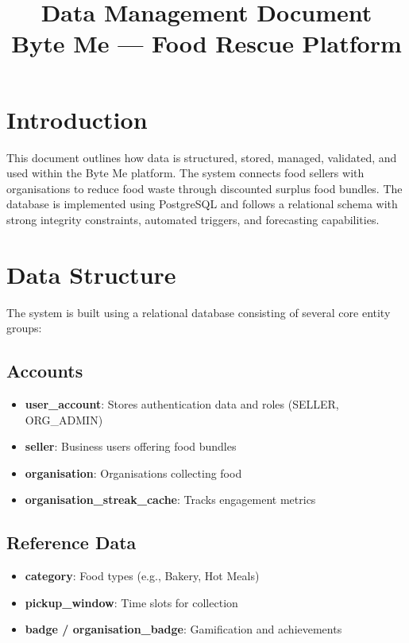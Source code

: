 \documentclass[12pt]{article}
\title{Data Management Document\\
\large Byte Me --- Food Rescue Platform}
\author{}
\date{}
\begin{document}
\maketitle

\section{Introduction}
This document outlines how data is structured, stored, managed, validated, and used within the Byte Me platform. The system connects food sellers with organisations to reduce food waste through discounted surplus food bundles. 
The database is implemented using PostgreSQL and follows a relational schema with strong integrity constraints, automated triggers, and forecasting capabilities.

\section{Data Structure}
The system is built using a relational database consisting of several core entity groups:

\subsection{Accounts}
\begin{itemize}
\item \textbf{user\_account}: Stores authentication data and roles (SELLER, ORG\_ADMIN)
\item \textbf{seller}: Business users offering food bundles
\item \textbf{organisation}: Organisations collecting food
\item \textbf{organisation\_streak\_cache}: Tracks engagement metrics
\end{itemize}

\subsection{Reference Data}
\begin{itemize}
\item \textbf{category}: Food types (e.g., Bakery, Hot Meals)
\item \textbf{pickup\_window}: Time slots for collection
\item \textbf{badge / organisation\_badge}: Gamification and achievements
\end{itemize}
\end{document}
